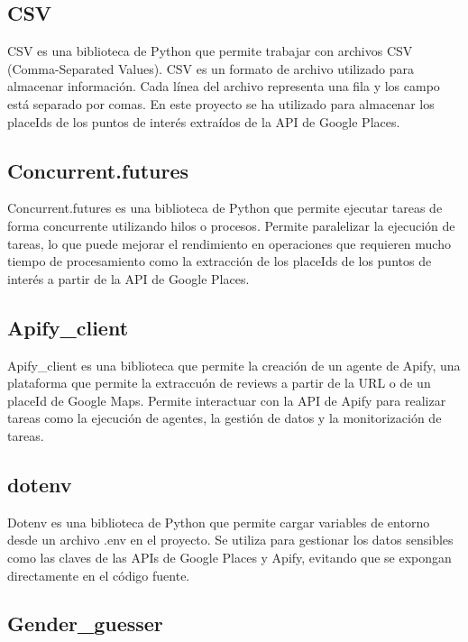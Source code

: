 \subsection{CSV}

CSV es una biblioteca de Python que permite trabajar con archivos CSV (Comma-Separated Values).
CSV es un formato de archivo utilizado para almacenar información. Cada línea del archivo representa una fila y los campo está separado por comas.
En este proyecto se ha utilizado para almacenar los placeIds de los puntos de interés extraídos de la API de Google Places.

\subsection{Concurrent.futures}

Concurrent.futures es una biblioteca de Python que permite ejecutar tareas de forma concurrente utilizando hilos o procesos.
Permite paralelizar la ejecución de tareas, lo que puede mejorar el rendimiento en operaciones que requieren mucho tiempo de procesamiento como la extracción de los placeIds de los puntos de interés a partir de la API de Google Places.

\subsection{Apify\_client}

Apify\_client es una biblioteca que permite la creación de un agente de Apify, una plataforma que permite la extraccuón de reviews a partir de la URL o de un placeId de Google Maps. 
Permite interactuar con la API de Apify para realizar tareas como la ejecución de agentes, la gestión de datos y la monitorización de tareas.

\subsection{dotenv}

Dotenv es una biblioteca de Python que permite cargar variables de
entorno desde un archivo .env en el proyecto. Se utiliza para gestionar
los datos sensibles como las claves de las APIs de Google Places y Apify,
evitando que se expongan directamente en el código fuente.

\subsection{Gender\_guesser}

